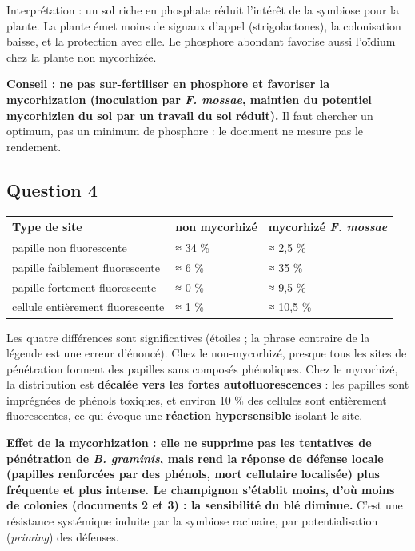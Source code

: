 \documentclass[11pt,a4paper]{article}
\begin{document}
Interprétation : un sol riche en phosphate réduit l'intérêt de la symbiose pour la plante. La plante émet moins de signaux d'appel (strigolactones), la colonisation baisse, et la protection avec elle. Le phosphore abondant favorise aussi l'oïdium chez la plante non mycorhizée.

\textbf{Conseil : ne pas sur-fertiliser en phosphore et favoriser la mycorhization (inoculation par \emph{F. mossae}, maintien du potentiel mycorhizien du sol par un travail du sol réduit).} Il faut chercher un optimum, pas un minimum de phosphore : le document ne mesure pas le rendement.

\hypertarget{question-4}{%
\subsection{Question 4}\label{question-4}}

\begin{longtable}[]{@{}lll@{}}
\toprule\noalign{}
Type de site & non mycorhizé & mycorhizé \emph{F. mossae} \\
\midrule\noalign{}
\endhead
\bottomrule\noalign{}
\endlastfoot
papille non fluorescente & ≈ 34 \% & ≈ 2,5 \% \\
papille faiblement fluorescente & ≈ 6 \% & ≈ 35 \% \\
papille fortement fluorescente & ≈ 0 \% & ≈ 9,5 \% \\
cellule entièrement fluorescente & ≈ 1 \% & ≈ 10,5 \% \\
\end{longtable}

Les quatre différences sont significatives (étoiles ; la phrase contraire de la légende est une erreur d'énoncé). Chez le non-mycorhizé, presque tous les sites de pénétration forment des papilles sans composés phénoliques. Chez le mycorhizé, la distribution est \textbf{décalée vers les fortes autofluorescences} : les papilles sont imprégnées de phénols toxiques, et environ 10 \% des cellules sont entièrement fluorescentes, ce qui évoque une \textbf{réaction hypersensible} isolant le site.

\textbf{Effet de la mycorhization : elle ne supprime pas les tentatives de pénétration de \emph{B. graminis}, mais rend la réponse de défense locale (papilles renforcées par des phénols, mort cellulaire localisée) plus fréquente et plus intense. Le champignon s'établit moins, d'où moins de colonies (documents 2 et 3) : la sensibilité du blé diminue.} C'est une résistance systémique induite par la symbiose racinaire, par potentialisation (\emph{priming}) des défenses.
\end{document}
